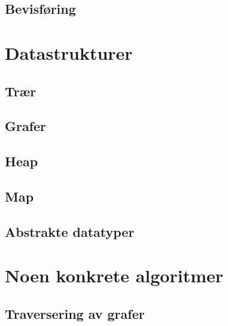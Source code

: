 \documentclass[book, 10pt, hidelinks, norsk, a4paper]{memoir}
\begin{document}
\chapter{Bevisføring}






\part{Datastrukturer}


\chapter{Trær}
\newpage






\chapter{Grafer}



 \vspace{-15pt}




\chapter{Heap}




\chapter{Map}




\chapter{Abstrakte datatyper}




\part{Noen konkrete algoritmer}


\chapter{Traversering av grafer}


\end{document}
